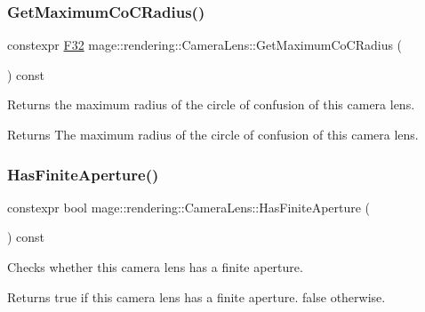 \subsubsection{\texorpdfstring{Get\+Maximum\+Co\+C\+Radius()}{GetMaximumCoCRadius()}}
{\footnotesize\ttfamily constexpr \mbox{\hyperlink{namespacemage_aa97e833b45f06d60a0a9c4fc22ae02c0}{F32}} mage\+::rendering\+::\+Camera\+Lens\+::\+Get\+Maximum\+Co\+C\+Radius (\begin{DoxyParamCaption}{ }\end{DoxyParamCaption}) const\hspace{0.3cm}{\ttfamily [noexcept]}}

Returns the maximum radius of the circle of confusion of this camera lens.

\begin{DoxyReturn}{Returns}
The maximum radius of the circle of confusion of this camera lens. 
\end{DoxyReturn}
\mbox{\label{classmage_1_1rendering_1_1_camera_lens_a09a7cc18ca89da0c177c4f7dc0bbcc41}} 
\subsubsection{\texorpdfstring{Has\+Finite\+Aperture()}{HasFiniteAperture()}}
{\footnotesize\ttfamily constexpr bool mage\+::rendering\+::\+Camera\+Lens\+::\+Has\+Finite\+Aperture (\begin{DoxyParamCaption}{ }\end{DoxyParamCaption}) const\hspace{0.3cm}{\ttfamily [noexcept]}}

Checks whether this camera lens has a finite aperture.

\begin{DoxyReturn}{Returns}
{\ttfamily true} if this camera lens has a finite aperture. {\ttfamily false} otherwise. 
\end{DoxyReturn}
\mbox{\label{classmage_1_1rendering_1_1_camera_lens_addbc0f6e5ca70e491022edde1bf6f691}} 
